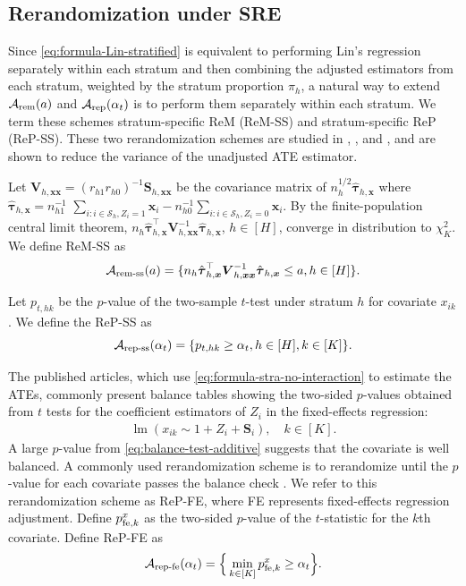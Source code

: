 \documentclass[12pt]{article}
\newcommand{\lmm}{\operatorname{lm}}
\newcommand{\ma}{\mathcal{A}}
\newcommand{\ms}{\mathcal{S}}
\newcommand{\rem}{\textnormal{rem}}
\newcommand{\remss}{\textnormal{rem-ss}}
\newcommand{\repss}{\textnormal{rep-ss}}
\newcommand{\repfe}{\textnormal{rep-fe}}
\newcommand{\rep}{\textnormal{rep}}
\newcommand{\fe}{\textnormal{fe}}
\newcommand{\bs}{\boldsymbol}
\begin{document}
\subsection{Rerandomization under SRE}
Since \eqref{eq:formula-Lin-stratified} is equivalent to performing Lin's regression separately within each stratum and then combining the adjusted estimators from each stratum, weighted by the stratum proportion $\pi_h$, a natural way to extend $\ma_{\rem}(a)$ and $\ma_{\rep}(\alpha_t)$ is to perform them separately within each stratum. We term these schemes stratum-specific ReM (ReM-SS) and stratum-specific ReP (ReP-SS). These two rerandomization schemes are studied in \citet{wang2021rerandomization}, \citet{johansson2022rerandomization}, and \citet{zdrep}, and are shown to reduce the variance of the unadjusted ATE estimator. 


Let $\bs{V}_{ h,  \bs{x}\bs{x}} =  (r_{ h 1}r_{ h 0})^{-1}\bs{S}_{ h,  \bs{x}\bs{x}}$ be the covariance matrix of $n_h^{1/2}\hat{\bs{\tau}}_{ h, \bs{x}}$ where $\hat{\bs{\tau}}_{ h, \bs{x}} = n_{h1}^{-1}$ $\sum_{i: i\in\ms_{ h }, Z_i=1}\bs{x}_i-n_{h0}^{-1}\sum_{i:i\in\ms_{ h },Z_i=0}\bs{x}_i$. 
By the finite-population central limit theorem, $n_{ h }\hat{\bs{\tau}}_{ h,  \bs{x}}^\top\bs{V}_{ h,  \bs{x}\bs{x}}^{-1}\hat{\bs{\tau}}_{ h,  \bs{x}}$, $h\in  [H]$, converge in distribution to $\chi^2_{K}$.  We define ReM-SS as
\begin{align*}
    \ma_{\remss}(a) =\{ n_{ h }\hat{\bs{\tau}}_{ h,  \bs{x}}^\top\bs{V}_{ h,  \bs{x}\bs{x}}^{-1}\hat{\bs{\tau}}_{ h,  \bs{x}}\leq a, h\in   [H]  \}.
\end{align*}
 
Let $p_{t, hk}$ be the $p$-value of the two-sample $t$-test under stratum $h$ for covariate $x_{ik}$. We define the ReP-SS as 
 $$\ma_{\repss}(\alpha_t) = \{p_{t, hk}\geq \alpha_t,h\in  [H] , k\in [K]\}.$$   

 The published articles, which use \eqref{eq:formula-stra-no-interaction} to estimate the ATEs, commonly present balance tables showing the two-sided $p$-values obtained from $t$ tests for the coefficient estimators of $Z_i$ in the fixed-effects regression:
\begin{align}
\label{eq:balance-test-additive}
    \lmm(x_{ik} \sim 1+ Z_i+\bs{S}_i),\quad k\in [K].
\end{align}
A large $p$-value from \eqref{eq:balance-test-additive} suggests that the covariate is well balanced. A commonly used rerandomization scheme is to rerandomize until the $p$-value for each covariate passes the balance check \citep{firpo2020balancing}. We refer to this rerandomization scheme as ReP-FE, where FE represents fixed-effects regression adjustment.
 Define $p_{\fe,k}^{x}$ as the two-sided  $p$-value of the $t$-statistic for the $k$th covariate. Define ReP-FE as
  $$
  \ma_{\repfe}(\alpha_t) = \Big\{\min_{k\in [K]} p_{\fe,k}^{x} \geq \alpha_t\Big\}.
  $$
\end{document}
